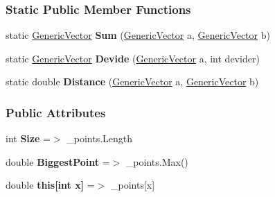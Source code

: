 \subsubsection*{Static Public Member Functions}
\begin{DoxyCompactItemize}
\item 
\mbox{\label{classDataTools_1_1GenericVector_af0e039764e63ac4045ae9946c22876b7}} 
static \hyperlink{classDataTools_1_1GenericVector}{Generic\+Vector} {\bfseries Sum} (\hyperlink{classDataTools_1_1GenericVector}{Generic\+Vector} a, \hyperlink{classDataTools_1_1GenericVector}{Generic\+Vector} b)
\item 
\mbox{\label{classDataTools_1_1GenericVector_a4d4381024a0923328a212e567f5f3a65}} 
static \hyperlink{classDataTools_1_1GenericVector}{Generic\+Vector} {\bfseries Devide} (\hyperlink{classDataTools_1_1GenericVector}{Generic\+Vector} a, int devider)
\item 
\mbox{\label{classDataTools_1_1GenericVector_ab2af09a4dcf0d49252e0a388de75b1a6}} 
static double {\bfseries Distance} (\hyperlink{classDataTools_1_1GenericVector}{Generic\+Vector} a, \hyperlink{classDataTools_1_1GenericVector}{Generic\+Vector} b)
\end{DoxyCompactItemize}
\subsubsection*{Public Attributes}
\begin{DoxyCompactItemize}
\item 
\mbox{\label{classDataTools_1_1GenericVector_af06eb7b9b70be91dadd4f12ebcaed796}} 
int {\bfseries Size} =$>$ \+\_\+points.\+Length
\item 
\mbox{\label{classDataTools_1_1GenericVector_ab9334ca30e9ffb3ef0406a11c712f05c}} 
double {\bfseries Biggest\+Point} =$>$ \+\_\+points.\+Max()
\item 
\mbox{\label{classDataTools_1_1GenericVector_a18bad8396584a2fd063e49ba30a84d55}} 
double {\bfseries this\mbox{[}int x\mbox{]}} =$>$ \+\_\+points\mbox{[}x\mbox{]}
\end{DoxyCompactItemize}
